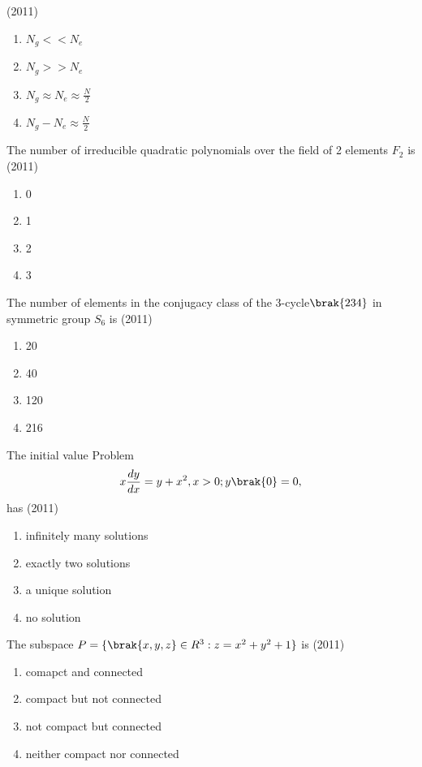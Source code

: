     \hfill (2011)
    \begin{enumerate}[label=(\Alph*)]
        \item $N_g<<N_e$
        \item $N_g>>N_e$
        \item $N_g\approx N_e\approx \frac{N}{2}$
        \item $N_g-N_e\approx \frac{N}{2}$
    \end{enumerate}
    \item The number of irreducible quadratic polynomials over the field of 2 elements $F_2$ is  \hfill (2011)
    \begin{enumerate}[label=(\Alph*)]
        \item 0
        \item 1
        \item 2
        \item 3
    \end{enumerate}
    \item The number of elements in the conjugacy class of the 3-cycle$\brak{2 3 4}$ in symmetric group $S_6$ is  \hfill (2011)
    \begin{enumerate}[label=(\Alph*)]
        \item 20
        \item 40 
        \item 120
        \item 216
    \end{enumerate}
    \item The initial value Problem
    $$x\frac{dy}{dx} = y + x^2, x>0; y\brak{0} = 0,$$ has  \hfill (2011)
    \begin{enumerate}[label=(\Alph*)]
        \item infinitely many solutions
        \item exactly two solutions
        \item a unique solution
        \item no solution
    \end{enumerate}
    \item The subspace $P = \{\brak{x,y,z}\in R^3 : z = x^2 + y^2 + 1\}$ is  \hfill (2011)
    \begin{enumerate}[label=(\Alph*)]
        \item comapct and connected
        \item compact but not connected
        \item not compact but connected
        \item neither compact nor connected
    \end{enumerate}
